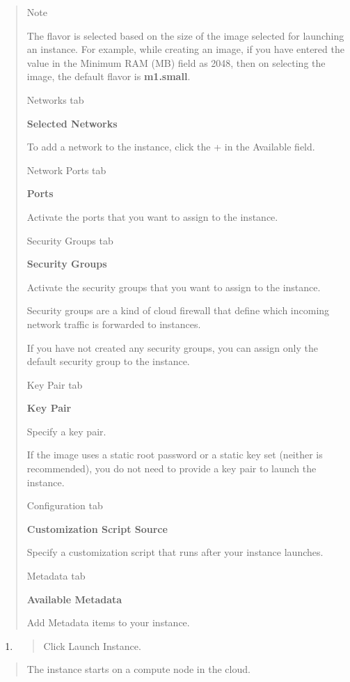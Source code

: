 \begin{quote}
Note

The flavor is selected based on the size of the image selected for
launching an instance. For example, while creating an image, if you have
entered the value in the Minimum RAM (MB) field as 2048, then on
selecting the image, the default flavor is \textbf{m1.small}.

Networks tab

\textbf{Selected Networks}

To add a network to the instance, click the + in the Available field.

Network Ports tab

\textbf{Ports}

Activate the ports that you want to assign to the instance.

Security Groups tab

\textbf{Security Groups}

Activate the security groups that you want to assign to the instance.

Security groups are a kind of cloud firewall that define which incoming
network traffic is forwarded to instances.

If you have not created any security groups, you can assign only the
default security group to the instance.

Key Pair tab

\textbf{Key Pair}

Specify a key pair.

If the image uses a static root password or a static key set (neither is
recommended), you do not need to provide a key pair to launch the
instance.

Configuration tab

\textbf{Customization Script Source}

Specify a customization script that runs after your instance launches.

Metadata tab

\textbf{Available Metadata}

Add Metadata items to your instance.
\end{quote}

\begin{enumerate}
\def\labelenumi{\arabic{enumi}.}
\item
  \begin{quote}
  Click Launch Instance.
  \end{quote}
\end{enumerate}

\begin{quote}
The instance starts on a compute node in the cloud.
\end{quote}

